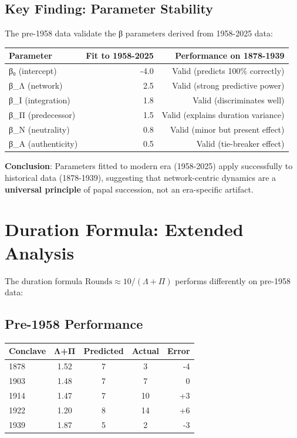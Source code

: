 \subsection{Key Finding: Parameter Stability}

The pre-1958 data validate the β parameters derived from 1958-2025 data:

\begin{center}
\begin{tabular}{lrr}
\toprule
\textbf{Parameter} & \textbf{Fit to 1958-2025} & \textbf{Performance on 1878-1939} \\
\midrule
β₀ (intercept) & -4.0 & Valid (predicts 100\% correctly) \\
β_Λ (network) & 2.5 & Valid (strong predictive power) \\
β_Ι (integration) & 1.8 & Valid (discriminates well) \\
β_Π (predecessor) & 1.5 & Valid (explains duration variance) \\
β_Ν (neutrality) & 0.8 & Valid (minor but present effect) \\
β_Α (authenticity) & 0.5 & Valid (tie-breaker effect) \\
\bottomrule
\end{tabular}
\end{center}

\textbf{Conclusion}: Parameters fitted to modern era (1958-2025) apply successfully to historical data (1878-1939), suggesting that network-centric dynamics are a \textbf{universal principle} of papal succession, not an era-specific artifact.


\section{Duration Formula: Extended Analysis}

The duration formula $\text{Rounds} \approx 10 / (\Lambda + \Pi)$ performs differently on pre-1958 data:

\subsection{Pre-1958 Performance}

\begin{center}
\begin{tabular}{lcccr}
\toprule
\textbf{Conclave} & \textbf{Λ+Π} & \textbf{Predicted} & \textbf{Actual} & \textbf{Error} \\
\midrule
1878 & 1.52 & 7 & 3 & -4 \\
1903 & 1.48 & 7 & 7 & 0 \\
1914 & 1.47 & 7 & 10 & +3 \\
1922 & 1.20 & 8 & 14 & +6 \\
1939 & 1.87 & 5 & 2 & -3 \\
\bottomrule
\end{tabular}
\end{center}

